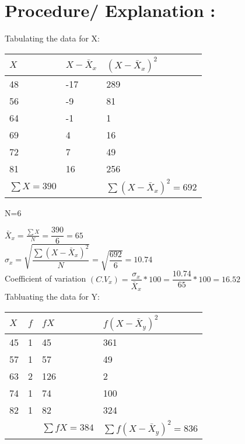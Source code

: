 \documentclass[11pt]{article}
\begin{document}
\section{Procedure/ Explanation :}
 Tabulating the data for X:\\
 \vspace{-0.5cm}
 \begin{center}
 \begin{tabular}{ |p{2.2cm}||p{1.9cm}||p{3.3cm}|  }
 \hline
 $X$ & $X- \bar{X}_x$ & $(X-\bar{X}_x)^2$\\
 \hline
 48 & -17 & 289 \\
 56 & -9 & 81  \\
 64 & -1 & 1 \\
 69 & 4 & 16 \\
 72 & 7 & 49 \\
 81 & 16 & 256 \\
 \hline
 $ \sum X=390$ &  & $ \sum (X-\bar{X}_x)^2=692$ \\
 \hline
\end{tabular}
\end{center}
\vspace{0.5cm}

N=6


$\bar{X}_x=\displaystyle\frac{\sum X}{N}=\dfrac{390}{6}=65$\\[5pt]


$\sigma_x= \sqrt{\dfrac{\sum (X-\bar{X}_x)^2}{N}}
= \sqrt{\dfrac{692}{6}}=10.74 $\\[5pt]

Coefficient of variation $(C.V_x)=\dfrac{\sigma_x}{\bar{X}_x}*100 = \dfrac{10.74}{65}*100 = 16.52$\\[5cm]

Tabluating the data for Y:
\vspace{0.3cm}
 \begin{center}
 \begin{tabular}{ |p{2.2cm}||p{1.9cm}||p{2.3cm}||p{3.4cm}|  }
 \hline
 $X$ & $f$ & $fX$ & $f(X-\bar{X}_y)^2$ \\
 \hline
 45 & 1 & 45 & 361 \\
 57 & 1 & 57 & 49 \\
 63 & 2 & 126 & 2 \\
 74 & 1 & 74 & 100 \\
 82 & 1 & 82 & 324 \\
 \hline
  &   & $\sum fX=384$&$ \sum f(X-\bar{X}_y)^2=836$  \\
 \hline
\end{tabular}
\end{center}
\vspace{0.5cm}
\end{document}
